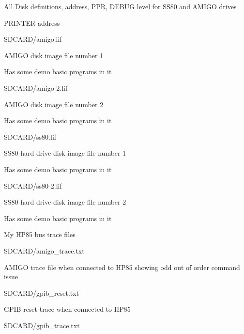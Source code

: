 {\begin{DoxyItemize}
\begin{DoxyItemize}
\begin{DoxyItemize}
\begin{DoxyItemize}
\item All Disk definitions, address, P\+PR, D\+E\+B\+UG level for S\+S80 and A\+M\+I\+GO drives
\item P\+R\+I\+N\+T\+ER address
\end{DoxyItemize}
\item S\+D\+C\+A\+R\+D/amigo.\+lif
\begin{DoxyItemize}
\item A\+M\+I\+GO disk image file number 1
\item Has some demo basic programs in it
\end{DoxyItemize}
\item S\+D\+C\+A\+R\+D/amigo-\/2.\+lif
\begin{DoxyItemize}
\item A\+M\+I\+GO disk image file number 2
\item Has some demo basic programs in it
\end{DoxyItemize}
\item S\+D\+C\+A\+R\+D/ss80.\+lif
\begin{DoxyItemize}
\item S\+S80 hard drive disk image file number 1
\item Has some demo basic programs in it
\end{DoxyItemize}
\item S\+D\+C\+A\+R\+D/ss80-\/2.\+lif
\begin{DoxyItemize}
\item S\+S80 hard drive disk image file number 2
\item Has some demo basic programs in it
\end{DoxyItemize}
\end{DoxyItemize}
\item My H\+P85 bus trace files
\begin{DoxyItemize}
\item S\+D\+C\+A\+R\+D/amigo\+\_\+trace.\+txt
\begin{DoxyItemize}
\item A\+M\+I\+GO trace file when connected to H\+P85 showing odd out of order command issue
\end{DoxyItemize}
\item S\+D\+C\+A\+R\+D/gpib\+\_\+reset.\+txt
\begin{DoxyItemize}
\item G\+P\+IB reset trace when connected to H\+P85
\end{DoxyItemize}
\item S\+D\+C\+A\+R\+D/gpib\+\_\+trace.\+txt

\end{DoxyItemize}
\end{DoxyItemize}
\end{DoxyItemize}}
